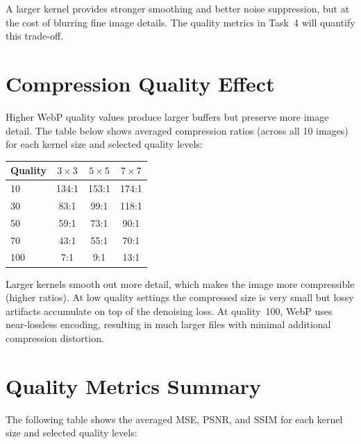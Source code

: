 \documentclass[11pt,a4paper]{article}
\begin{document}
A larger kernel provides stronger smoothing and better noise suppression, but at the cost of blurring fine image details.
The quality metrics in Task~4 will quantify this trade-off.

\section*{Compression Quality Effect}
Higher WebP quality values produce larger buffers but preserve more image detail.
The table below shows averaged compression ratios (across all 10 images) for each kernel size and selected quality levels:

\begin{center}
\begin{tabular}{l|c c c}
    \textbf{Quality} & $3{\times}3$ & $5{\times}5$ & $7{\times}7$ \\
    \hline
    10  & 134:1 & 153:1 & 174:1 \\
    30  &  83:1 &  99:1 & 118:1 \\
    50  &  59:1 &  73:1 &  90:1 \\
    70  &  43:1 &  55:1 &  70:1 \\
    100 &   7:1 &   9:1 &  13:1 \\
\end{tabular}
\end{center}

Larger kernels smooth out more detail, which makes the image more compressible (higher ratios).
At low quality settings the compressed size is very small but lossy artifacts accumulate on top of the denoising loss.
At quality~100, WebP uses near-lossless encoding, resulting in much larger files with minimal additional compression distortion.

\section*{Quality Metrics Summary}
The following table shows the averaged MSE, PSNR, and SSIM for each kernel size and selected quality levels:
\end{document}
